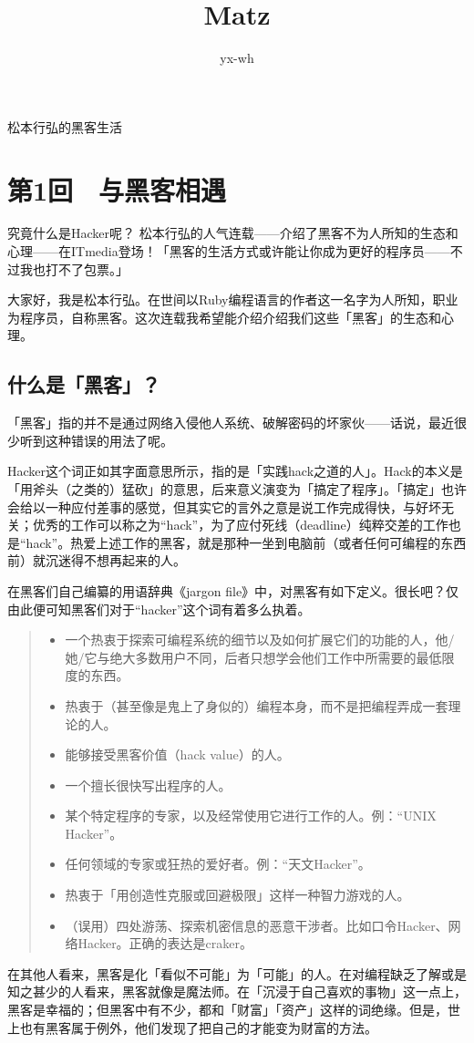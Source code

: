\documentclass[a4paper,12pt]{article}
\author{yx-wh}
\title{Matz}
\begin{document}
\newpage
松本行弘的黑客生活
\setcounter{tocdepth}{2}
\tableofcontents
\newpage

\section{第1回　与黑客相遇}
究竟什么是Hacker呢？ 松本行弘的人气连载——介绍了黑客不为人所知的生态和心理——在ITmedia登场！「黑客的生活方式或许能让你成为更好的程序员——不过我也打不了包票。」

大家好，我是松本行弘。在世间以Ruby编程语言的作者这一名字为人所知，职业为程序员，自称黑客。这次连载我希望能介绍介绍我们这些「黑客」的生态和心理。

\subsection{什么是「黑客」？}

「黑客」指的并不是通过网络入侵他人系统、破解密码的坏家伙——话说，最近很少听到这种错误的用法了呢。

Hacker这个词正如其字面意思所示，指的是「实践hack之道的人」。Hack的本义是「用斧头（之类的）猛砍」的意思，后来意义演变为「搞定了程序」。「搞定」也许会给以一种应付差事的感觉，但其实它的言外之意是说工作完成得快，与好坏无关；优秀的工作可以称之为“hack”，为了应付死线（deadline）纯粹交差的工作也是“hack”。热爱上述工作的黑客，就是那种一坐到电脑前（或者任何可编程的东西前）就沉迷得不想再起来的人。

在黑客们自己编纂的用语辞典《jargon file》中，对黑客有如下定义。很长吧？仅由此便可知黑客们对于“hacker”这个词有着多么执着。
\begin{quote}
	\begin{itemize}
		\item 一个热衷于探索可编程系统的细节以及如何扩展它们的功能的人，他/她/它与绝大多数用户不同，后者只想学会他们工作中所需要的最低限度的东西。
		\item 热衷于（甚至像是鬼上了身似的）编程本身，而不是把编程弄成一套理论的人。
		\item 能够接受黑客价值（hack value）的人。
		\item 一个擅长很快写出程序的人。
		\item 某个特定程序的专家，以及经常使用它进行工作的人。例：“UNIX Hacker”。
		\item 任何领域的专家或狂热的爱好者。例：“天文Hacker”。
		\item 热衷于「用创造性克服或回避极限」这样一种智力游戏的人。
		\item （误用）四处游荡、探索机密信息的恶意干涉者。比如口令Hacker、网络Hacker。正确的表达是craker。
	\end{itemize}
\end{quote}
在其他人看来，黑客是化「看似不可能」为「可能」的人。在对编程缺乏了解或是知之甚少的人看来，黑客就像是魔法师。在「沉浸于自己喜欢的事物」这一点上，黑客是幸福的；但黑客中有不少，都和「财富」「资产」这样的词绝缘。但是，世上也有黑客属于例外，他们发现了把自己的才能变为财富的方法。
\end{document}
